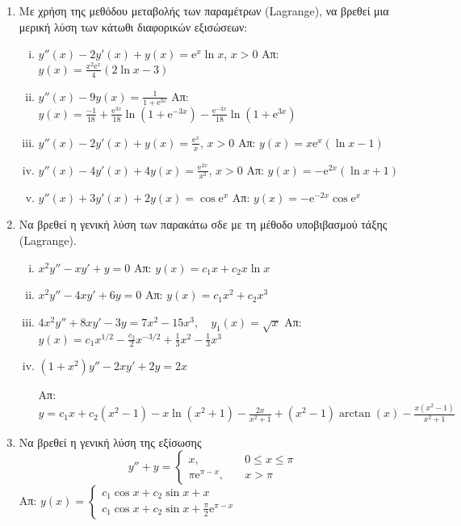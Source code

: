 \begin{enumerate}
  \item Με χρήση της μεθόδου μεταβολής των παραμέτρων (Lagrange), να βρεθεί 
    μια μερική λύση των κάτωθι διαφορικών εξισώσεων:
    \begin{enumerate}[i)]
      \item $y''(x)-2y'(x)+y(x)=\mathrm{e}^{x}\ln x$, $x>0$ 
        \hfill Απ: $y(x)=\frac{x^{2}\mathrm{e}^{x}}{4}(2\ln x-3)$
      \item $y''(x)-9y(x)=\frac{1}{1+\mathrm{e}^{3x}}$ 
        \hfill Απ: $y(x)=\frac{-1}{18}+\frac{\mathrm{e}^{3x}}{18}
        \ln (1+\mathrm{e}^{-3x})- \frac{\mathrm{e}^{-3x}}{18}\ln(1+\mathrm{e}^{3x})$
      \item $y''(x)-2y'(x)+y(x)=\frac{\mathrm{e}^x}{x}$, $x>0$ 
        \hfill Απ: $y(x)=x\mathrm{e}^{x}(\ln x-1)$
      \item $y''(x)-4y'(x)+4y(x)=\frac{\mathrm{e}^{2x}}{x^{2}}$, $x>0$ 
        \hfill Απ: $y(x)=-\mathrm{e}^{2x}(\ln x +1)$
      \item $y''(x)+3y'(x)+2y(x)=\cos \mathrm{e}^{x}$ 
        \hfill Απ: $y(x)=-\mathrm{e}^{-2x}\cos \mathrm{e}^{x}$
    \end{enumerate}

  \item Να βρεθεί η γενική λύση των παρακάτω σδε με τη μέθοδο υποβιβασμού τάξης 
    (Lagrange).
    \begin{enumerate}[i)]
      \item $ x^{2}y'' - xy' + y = 0 $ \hfill Απ: $ y(x)= c_{1}x + c_{2}x \ln{x} $ 
      \item $ x^{2}y'' - 4xy'+6y = 0 $ \hfill Απ: $ y(x)=c_{1}x^{2} + c_{2}x^{3} $ 
      \item $ 4x^{2}y'' + 8x y' -3y = 7x^{2}-15x^{3}, \quad y_{1}(x)= \sqrt{x} $ 
        \hfill Απ: $ y(x)= c_{1} x^{1/2} - \frac{c_{2}}{2} x^{-3/2} + 
        \frac{1}{3} x^{2} - \frac{1}{3} x^{3} $ 
      \item $ (1+x^{2})y''-2xy'+2y=2x $ 

        \hfill Απ: $ y= c_{1}x + c_{2}(x^{2}-1) - x \ln{(x^{2}+1)} - \frac{2x}{x^{2}+1}
        + (x^{2}-1) \arctan(x) - \frac{x(x^{2}-1)}{x^{2}+1} $
    \end{enumerate}

  \item Να βρεθεί η γενική λύση της εξίσωσης 
    \[
      y''+y = 
      \begin{cases} 
        x, \quad &0 \leq x \leq \pi \\
        \pi \mathrm{e}^{\pi -x}, \quad &x > \pi
      \end{cases}
    \] 
    \hfill Απ: $ y(x) = 
    \begin{cases} 
      c_{1} \cos{x} + c_{2} \sin{x} + x \\
      c_{1} \cos{x} + c_{2} \sin{x} + \frac{\pi}{2} \mathrm{e}^{\pi -x} 
    \end{cases} $ 
\end{enumerate}






